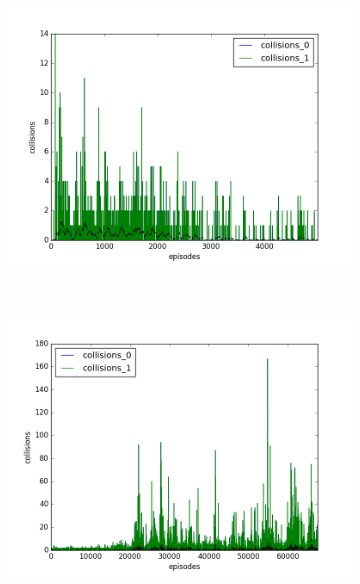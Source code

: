\begin{figure}[t]
  \vspace{\graphspacing}
  \begin{subfigure}[t]{\figscale\linewidth}
    \hspace*{-2.75cm}
    \includegraphics[width=1.5\textwidth]
    {../results/dqn_1vs1/collisions.png}
    \label{fig:dqn-1vs1-collisions}
  \end{subfigure}
  ~
  \begin{subfigure}[t]{\figscale\linewidth}
    \hspace*{-1.4cm}
    \includegraphics[width=1.5\textwidth]
    {../results/ddpg_1vs1/collisions.png}
    \label{fig:ddpg-1vs1-collisions}
  \end{subfigure}
  ~
  \begin{subfigure}[t]{\figscale\linewidth}

\end{subfigure}
\end{figure}

